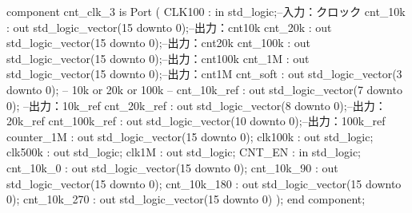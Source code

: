\begin{mylisting}[language=VHDL,caption=ゲート信号出力モジュール,label=MMC_PWM_GEN_module_VHDL]
	component cnt_clk_3 is
		Port (
			CLK100 : in std_logic;--入力：クロック
			cnt_10k : out std_logic_vector(15 downto 0);--出力：cnt10k
			cnt_20k : out std_logic_vector(15 downto 0);--出力：cnt20k
			cnt_100k : out std_logic_vector(15 downto 0);--出力：cnt100k
			cnt_1M : out std_logic_vector(15 downto 0);--出力：cnt1M
			cnt_soft : out std_logic_vector(3 downto 0); -- 10k or 20k or 100k --
			cnt_10k_ref : out std_logic_vector(7 downto 0); --出力：10k_ref
			cnt_20k_ref : out std_logic_vector(8 downto 0);--出力：20k_ref
			cnt_100k_ref : out std_logic_vector(10 downto 0);--出力：100k_ref
			counter_1M : out std_logic_vector(15 downto 0);
			clk100k : out std_logic;
			clk500k : out std_logic;
			clk1M : out std_logic;
			CNT_EN : in std_logic;
			cnt_10k_0 : out std_logic_vector(15 downto 0);
			cnt_10k_90 : out std_logic_vector(15 downto 0);
			cnt_10k_180 : out std_logic_vector(15 downto 0);
			cnt_10k_270 : out std_logic_vector(15 downto 0)
			);
	end component;




\end{mylisting}
